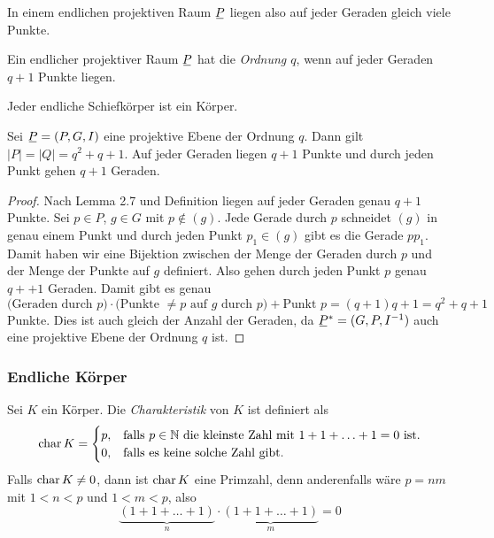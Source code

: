 In einem endlichen projektiven Raum $\proj$ liegen also auf jeder Geraden gleich viele Punkte.

\begin{defn*}
 Ein endlicher projektiver Raum $\proj$ hat die \emph{Ordnung $q$}, wenn auf jeder Geraden $q+1$ Punkte liegen.
\end{defn*}

\begin{thm*}[Wedderburn]
 Jeder endliche Schiefkörper ist ein Körper.
\end{thm*}

\begin{thm}
 Sei $\proj = (P,G,I)$ eine projektive Ebene der Ordnung $q$. Dann gilt $|P| = |Q| = q^2 + q +1$. Auf jeder Geraden liegen $q+1$ Punkte und durch jeden Punkt gehen $q+1$ Geraden.
\end{thm}

\begin{proof}
 Nach Lemma 2.7 und Definition liegen auf jeder Geraden genau $q+1$ Punkte. Sei $p \in P$, $g \in G$ mit $p \notin (g)$. Jede Gerade durch $p$ schneidet $(g)$ in genau einem Punkt und durch jeden Punkt $p_1 \in (g)$ gibt es die Gerade $p p_1$. Damit haben wir eine Bijektion zwischen der Menge der Geraden durch $p$ und der Menge der Punkte auf $g$ definiert. Also gehen durch jeden Punkt $p$ genau $q++1$ Geraden. Damit gibt es genau 
 \[ \text{(Geraden durch $p$)} \cdot \text{(Punkte $\ne p$ auf $g$ durch $p$)} + \text{Punkt $p$} = (q+1)q + 1 = q^2 + q +1 \]
 Punkte. Dies ist auch gleich der Anzahl der Geraden, da $\proj^* = (G,P,I^{-1})$ auch eine projektive Ebene der Ordnung $q$ ist.
\end{proof}

\subsubsection*{Endliche Körper}
\begin{defn*}
 Sei $K$ ein Körper. Die \emph{Charakteristik} von $K$ ist definiert als
 \[ \mathrm{char}\, K = \begin{cases} 
    p, &\text{falls $p \in \mathbb{N}$ die kleinste Zahl mit $1 + 1 + \ldots + 1 = 0$ ist.} \\
    0, &\text{falls es keine solche Zahl gibt.}         
   \end{cases} \]
Falls $\mathrm{char}\, K \ne 0$, dann ist $\mathrm{char}\, K$ eine Primzahl, denn anderenfalls wäre $p = nm$ mit $1 < n < p$ und $1 < m < p$, also
\[ \underbrace{( 1 + 1 + \ldots + 1)}_n \cdot \underbrace{( 1 + 1 + \ldots + 1)}_m = 0 \]
\end{defn*}

